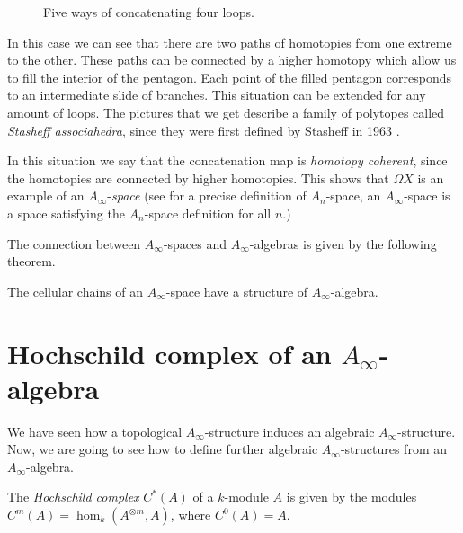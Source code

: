 \documentclass[bibtex,babel-main=english]{TEMat-article}
\begin{document}
\begin{figure}[H]
\caption{Five ways of concatenating four loops.}\label{coherent}
\end{figure}

In this case we can see that there are two paths of homotopies from one extreme to the other. These paths can be connected by a higher homotopy which allow us to fill the interior of the pentagon. Each point of the filled pentagon corresponds to an intermediate slide of branches. This situation can be extended for any amount of loops. The pictures that we get describe a family of polytopes called \emph{Stasheff associahedra}, since they were first defined by Stasheff in 1963 \citep{Stasheff}.

In this situation we say that the concatenation map is \emph{homotopy coherent}, since the homotopies are connected by higher homotopies. This shows that $\Omega X$ is an example of an $A_\infty$-\emph{space} (see \cite{Stasheff} for a precise definition of $A_n$-space, an $A_\infty$-space is a space satisfying the $A_n$-space definition for all $n$.)

The connection between $A_\infty$-spaces and $A_\infty$-algebras is given by the following theorem.

\begin{theorem}\cite[Proposition~9.2.8]{loday}
The cellular chains of an $A_\infty$-space have a structure of $A_\infty$-algebra.
\end{theorem}

\section{Hochschild complex of an $A_\infty$-algebra}
We have seen how a topological $A_\infty$-structure induces an algebraic $A_\infty$-structure. Now, we are going to see how to define further algebraic $A_\infty$-structures from an $A_\infty$-algebra.

\begin{definition}
	The \emph{Hochschild complex} $C^*(A)$ of a $k$-module $A$ is given by the modules $C^m(A)=\hom_k(A^{\otimes m}, A)$, where $C^0(A)=A$.
	\end{definition}
	
\end{document}
